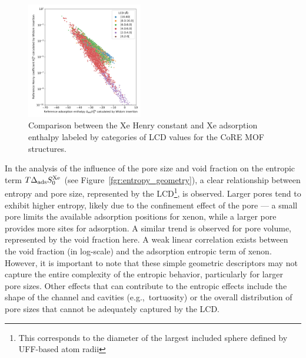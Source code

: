 \documentclass[main.tex]{subfiles}
\begin{document}
\begin{figure}
  \centering
  \includegraphics[width=0.45\textwidth]{figures/2-thermo/H_Xe_widom_vs_K_Xe_widom_overview.jpg}
  \caption{Comparison between the Xe Henry constant and Xe adsorption enthalpy labeled by categories of LCD values for the CoRE MOF structures.}\label{fgr:henry_enthalpy}
\end{figure}

In the analysis of the influence of the pore size and void fraction on the entropic term $T\Delta_{\text{ads}}S^{\text{Xe}}_{\text{0}}$ (see Figure~\ref{fgr:entropy_geometry}), a clear relationship between entropy and pore size, represented by the LCD\footnote[1]{This corresponds to the diameter of the largest included sphere defined by UFF-based atom radii}, is observed. Larger pores tend to exhibit higher entropy, likely due to the confinement effect of the pore --- a small pore limits the available adsorption positions for xenon, while a larger pore provides more sites for adsorption. A similar trend is observed for pore volume, represented by the void fraction here. A weak linear correlation exists between the void fraction (in log-scale) and the adsorption entropic term of xenon. However, it is important to note that these simple geometric descriptors may not capture the entire complexity of the entropic behavior, particularly for larger pore sizes. Other effects that can contribute to the entropic effects include the shape of the channel and cavities (e.g.,\ tortuosity) or the overall distribution of pore sizes that cannot be adequately captured by the LCD.
\end{document}
